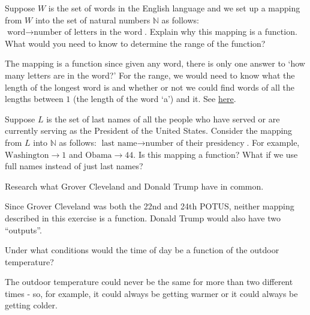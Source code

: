 \documentclass{ximera}
\begin{document}






\begin{problem} 
Suppose $W$ is the set of words in the English language and we set up a mapping from $W$ into the set of natural numbers $\mathbb{N}$ as follows: $\text{word} \rightarrow \text{number of letters in the word}$.  Explain why this mapping is a function.  What would you need to know to determine the range of the function?

The mapping is a function since given any word, there is only one answer to `how many letters are in the word?'  For the range, we would need to know what the length of the longest word is and whether or not we could find words of all the lengths between $1$ (the length of the word `a') and it.  See \href{https://en.wikipedia.org/wiki/Longest_word_in_English}{\underline{here}}.
\end{problem}

\begin{problem}
    Suppose $L$ is the set of last names of all the people who have served or are currently serving as the President of the United States.   Consider the mapping from $L$ into $\mathbb{N}$ as follows:  $\text{last name} \rightarrow \text{number of their presidency}$.  For example,  $\text{Washington} \rightarrow 1$ and $\text{Obama} \rightarrow 44$.  Is this mapping a function?  What if we use full names instead of just last names?
    \begin{hint}
    Research what Grover Cleveland and Donald Trump have in common.
    \end{hint}

Since Grover Cleveland was both the 22nd and 24th POTUS, neither mapping described in this exercise is a function.  Donald Trump would also have two ``outputs''.

\end{problem} 

\begin{problem}
  Under what conditions would the time of day be a function of the outdoor temperature? 

\begin{solution}
The outdoor temperature could never be the same for more than two different times - so, for example, it could always be getting warmer or it could always be getting colder.
\end{solution}
\end{problem}
\end{document}
